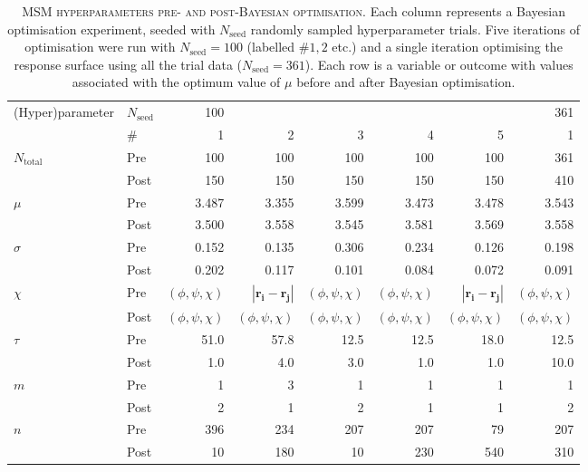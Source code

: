 \begin{table}
    \centering
    \caption[MSM hyperparameters pre- and post-Bayesian optimisation]{\textsc{MSM hyperparameters pre- and post-Bayesian optimisation}. Each column represents a Bayesian optimisation experiment, seeded with $N_{\mathrm{seed}}$ randomly sampled hyperparameter trials. Five iterations of optimisation were run with $N_{\mathrm{seed}}=100$ (labelled $\# 1, 2$ etc.) and a single iteration optimising the response surface using all the trial data ($N_{\mathrm{seed}}=361$). Each row is a variable or outcome with values associated with the optimum value of $\mu$ before and after Bayesian optimisation.}
    \begin{tabular}{llrrrrrr}
    \toprule
    (Hyper)parameter &$N_{\mathrm{seed}}$ & 100 & & & & &361\\
    &\#&1&2&3&4&5&1\\
    \midrule
    $N_{\mathrm{total}}$&Pre&100&100&100&100&100&361\\
    &Post&150&150&150&150&150&410\\
    \midrule
    $\mu$&Pre&3.487&3.355&3.599&3.473&3.478&3.543\\
    &Post&3.500&3.558&3.545&3.581&3.569&3.558\\
    \midrule
    $\sigma$&Pre&0.152&0.135&0.306&0.234&0.126&0.198\\
    &Post&0.202&0.117&0.101&0.084&0.072&0.091\\
    \midrule
    $\chi$&Pre&$(\phi,\psi,\chi)$&$|\mathbf{r_{i}}-\mathbf{r_{j}}|$&$(\phi,\psi,\chi)$&$(\phi,\psi,\chi)$&$|\mathbf{r_{i}}-\mathbf{r_{j}}|$&$(\phi,\psi,\chi)$\\
    &Post&$(\phi,\psi,\chi)$&$(\phi,\psi,\chi)$&$(\phi,\psi,\chi)$&$(\phi,\psi,\chi)$&$(\phi,\psi,\chi)$&$(\phi,\psi,\chi)$\\
    \midrule
    $\tau$&Pre&51.0&57.8&12.5&12.5&18.0&12.5\\
    &Post&1.0&4.0&3.0&1.0&1.0&10.0\\
    \midrule
    $m$&Pre&1&3&1&1&1&1\\
    &Post&2&1&2&1&1&2\\
    \midrule
    $n$&Pre&396&234&207&207&79&207\\
    &Post&10&180&10&230&540&310\\
    \bottomrule
    \end{tabular}
    \label{tab:aadh_opt_results}
\end{table}


